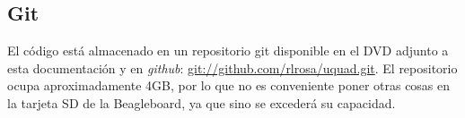 \documentclass[main]{subfiles}
\begin{document}







\subsection{Git}
\label{sec:codigo:git}

El código está almacenado en un repositorio git disponible en el DVD adjunto a esta documentación y en \textit{github}: \url{git://github.com/rlrosa/uquad.git}. El repositorio ocupa aproximadamente 4GB, por lo que no es conveniente poner otras cosas en la tarjeta SD de la Beagleboard, ya que sino se excederá su capacidad.
\end{document}
